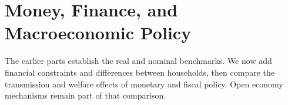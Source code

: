 \clearpage
\part{Money, Finance, and Macroeconomic Policy}\label{part:policy}

The earlier parts establish the real and nominal benchmarks. We now add
financial constraints and differences between households, then compare the
transmission and welfare effects of monetary and fiscal policy. Open economy
mechanisms remain part of that comparison.







